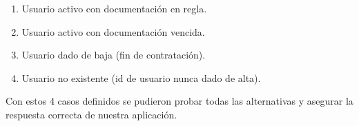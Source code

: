 \begin{enumerate}
\item Usuario activo con documentación en regla.
\item Usuario activo con documentación vencida.
\item Usuario dado de baja (fin de contratación).
\item Usuario no existente (id de usuario nunca dado de alta).
\end{enumerate}

Con estos 4 casos definidos se pudieron probar todas las alternativas y asegurar la respuesta correcta de nuestra aplicación.
